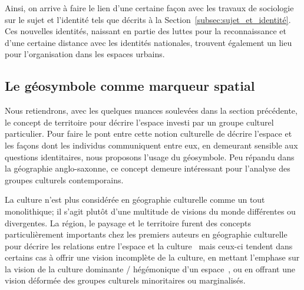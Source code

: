 Ainsi, on arrive à faire le lien d'une certaine façon avec les travaux de sociologie sur le sujet et l'identité tels que décrits à la Section~\ref{subsec:sujet_et_identité}. 
Ces nouvelles identités, naissant en partie des luttes pour la reconnaissance et d'une certaine distance avec les identités nationales, trouvent également un lieu pour l'organisation dans les espaces urbains.





\subsection{Le géosymbole comme marqueur spatial}
\label{sec:le_symbole_comme_marqueur_spatial} Nous retiendrons, avec les quelques nuances soulevées dans la section précédente, le concept de territoire pour décrire l'espace investi par un groupe culturel particulier. 
Pour faire le pont entre cette notion culturelle de décrire l'espace et les façons dont les individus communiquent entre eux, en demeurant sensible aux questions identitaires, nous proposons l'usage du géosymbole. 
Peu répandu dans la géographie anglo-saxonne, ce concept demeure intéressant pour l'analyse des groupes culturels contemporains.

La culture n'est plus considérée en géographie culturelle comme un tout monolithique; il s'agit plutôt d'une multitude de visions du monde différentes ou divergentes. 
La région, le paysage et le territoire furent des concepts particulièrement importants chez les premiers auteurs en géographie culturelle pour décrire les relations entre l'espace et la culture~\citep{Bonnemaison1981,Monnet1998,DiMeo1998,} mais ceux-ci tendent dans certains cas à offrir une vision incomplète de la culture, en mettant l'emphase sur la vision de la culture dominante / hégémonique d'un espace~\citep[11-12]{Duncan1993}, ou en offrant une vision déformée des groupes culturels minoritaires ou marginalisés.

